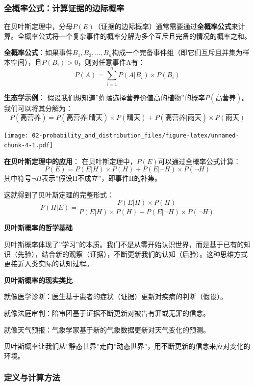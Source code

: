 \documentclass[
  twoside]{book}
\begin{document}
\hypertarget{ux5168ux6982ux7387ux516cux5f0fux8ba1ux7b97ux8bc1ux636eux7684ux8fb9ux9645ux6982ux7387}{%
\subsubsection{全概率公式：计算证据的边际概率}\label{ux5168ux6982ux7387ux516cux5f0fux8ba1ux7b97ux8bc1ux636eux7684ux8fb9ux9645ux6982ux7387}}

在贝叶斯定理中，分母\(P(E)\)（证据的边际概率）通常需要通过\textbf{全概率公式}来计算。全概率公式将一个复杂事件的概率分解为多个互斥且完备的情况的概率之和。

\textbf{全概率公式}：如果事件\(B_1, B_2, \ldots, B_n\)构成一个完备事件组（即它们互斥且并集为样本空间），且\(P(B_i) > 0\)，则对任意事件A有：
\[P(A) = \sum_{i=1}^{n} P(A|B_i) \times P(B_i)\]

\textbf{生态学示例}：
假设我们想知道''蚱蜢选择营养价值高的植物''的概率\(P(\text{高营养})\)。我们可以将其分解为：
\[P(\text{高营养}) = P(\text{高营养}|\text{晴天}) \times P(\text{晴天}) + P(\text{高营养}|\text{雨天}) \times P(\text{雨天})\]

\texttt{[image: 02-probability\_and\_distribution\_files/figure-latex/unnamed-chunk-4-1.pdf]}

\textbf{在贝叶斯定理中的应用}：
在贝叶斯定理中，\(P(E)\)可以通过全概率公式计算：
\[P(E) = P(E|H) \times P(H) + P(E|\neg H) \times P(\neg H)\]
其中符号\(\neg H\)表示''假设H不成立''，即事件H的补集。

这就得到了贝叶斯定理的完整形式：
\[P(H|E) = \frac{P(E|H) \times P(H)}{P(E|H) \times P(H) + P(E|\neg H) \times P(\neg H)}\]

\textbf{贝叶斯概率的哲学基础}

贝叶斯概率体现了''学习''的本质。我们不是从零开始认识世界，而是基于已有的知识（先验），结合新的观察（证据），不断更新我们的认知（后验）。这种思维方式更接近人类实际的认知过程。

\textbf{贝叶斯概率的现实类比}

就像医学诊断：医生基于患者的症状（证据）更新对疾病的判断（假设）。

就像法庭审判：陪审团基于证据不断更新对被告有罪或无罪的信念。

就像天气预报：气象学家基于新的气象数据更新对天气变化的预测。

贝叶斯概率让我们从''静态世界''走向''动态世界''，用不断更新的信念来应对变化的环境。

\hypertarget{ux5b9aux4e49ux4e0eux8ba1ux7b97ux65b9ux6cd5-1}{%
\subsubsection{定义与计算方法}\label{ux5b9aux4e49ux4e0eux8ba1ux7b97ux65b9ux6cd5-1}}
\end{document}
